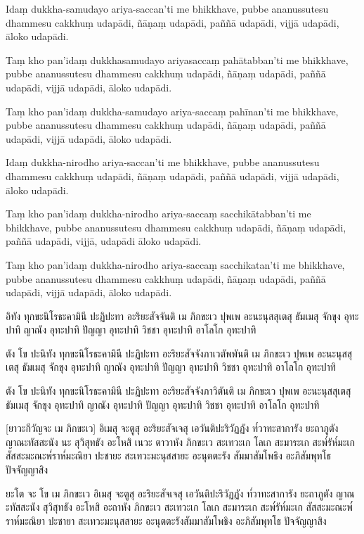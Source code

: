 \documentclass[
  babelLanguage=thai,
  final,
]{chantingbook}
\begin{document}
Idaṃ dukkha-samudayo ariya-saccan'ti me bhikkhave, pubbe ananussutesu
dhammesu cakkhuṃ udapādi, ñāṇaṃ udapādi, paññā udapādi, vijjā udapādi,
āloko udapādi.

Taṃ kho pan'idaṃ dukkhasamudayo ariyasaccaṃ pahātabban'ti me bhikkhave,
pubbe ananussutesu dhammesu cakkhuṃ udapādi, ñāṇaṃ udapādi, paññā
udapādi, vijjā udapādi, āloko udapādi.

Taṃ kho pan'idaṃ dukkha-samudayo ariya-saccaṃ pahīnan'ti me bhikkhave, pubbe
ananussutesu dhammesu cakkhuṃ udapādi, ñāṇaṃ udapādi, paññā udapādi,
vijjā udapādi, āloko udapādi.

Idaṃ dukkha-nirodho ariya-saccan'ti me bhikkhave, pubbe ananussutesu
dhammesu cakkhuṃ udapādi, ñāṇaṃ udapādi, paññā udapādi, vijjā udapādi,
āloko udapādi.

Taṃ kho pan'idaṃ dukkha-nirodho ariya-saccaṃ sacchikātabban'ti me bhikkhave,
pubbe ananussutesu dhammesu cakkhuṃ udapādi, ñāṇaṃ udapādi, paññā
udapādi, vijjā, udapādi āloko udapādi.

Taṃ kho pan'idaṃ dukkha-nirodho ariya-saccaṃ sacchikatan'ti me bhikkhave,
pubbe ananussutesu dhammesu cakkhuṃ udapādi, ñāṇaṃ udapādi, paññā
udapādi, vijjā udapādi, āloko udapādi.

\clearpage

\thaiText
\markboth{\thaiTitle}{\rightmark}

อิทัง ทุกขะนิโรธะคามินี ปะฏิปะทา อะริยะสัจจันติ เม ภิกขะเว ปุพเพ อะนะนุสสุเตสุ ธัมเมสุ
จักขุง อุทะปาทิ ญาณัง อุทะปาทิ ปัญญา อุทะปาทิ วิชชา อุทะปาทิ อาโลโก อุทะปาทิ

ตัง โข ปะนิทัง ทุกขะนิโรธะคามินี ปะฏิปะทา อะริยะสัจจังภาเวตัพพันติ เม ภิกขะเว ปุพเพ อะนะนุสสุเตสุ
ธัมเมสุ จักขุง อุทะปาทิ ญาณัง อุทะปาทิ ปัญญา อุทะปาทิ วิชชา อุทะปาทิ อาโลโก อุทะปาทิ

ตัง โข ปะนิทัง ทุกขะนิโรธะคามินี ปะฏิปะทา อะริยะสัจจังภาวิตันติ เม ภิกขะเว ปุพเพ อะนะนุสสุเตสุ
ธัมเมสุ จักขุง อุทะปาทิ ญาณัง อุทะปาทิ ปัญญา อุทะปาทิ วิชชา อุทะปาทิ อาโลโก อุทะปาทิ

[ยาวะกีวัญจะ เม ภิกขะเว] อิเมสุ จะตูสุ อะริยะสัจเจสุ เอวันติปะริวัฏฏัง
ท๎วาทะสาการัง ยะถาภูตัง ญาณะทัสสะนัง นะ สุวิสุทธัง อะโหสิ 
เนวะ ตาวาหัง ภิกขะเว สะเทวะเก โลเก สะมาระเก สะพ๎รัห๎มะเก สัสสะมะณะพ๎ราห๎มะณิยา
ปะชายะ สะเทวะมะนุสสายะ อะนุตตะรัง สัมมาสัมโพธิง อะภิสัมพุทโธ ปัจจัญญาสิง

ยะโต จะ โข เม ภิกขะเว อิเมสุ จะตูสุ อะริยะสัจเจสุ เอวันติปะริวัฏฏัง
ท๎วาทะสาการัง ยะถาภูตัง ญาณะทัสสะนัง สุวิสุทธัง อะโหสิ
อะถาหัง ภิกขะเว สะเทวะเก โลเก สะมาระเก สะพ๎รัห๎มะเก สัสสะมะณะพ๎ราห๎มะณิยา
ปะชายา สะเทวะมะนุสสายะ อะนุตตะรังสัมมาสัมโพธิง อะภิสัมพุทโธ ปัจจัญญาสิง
\end{document}
